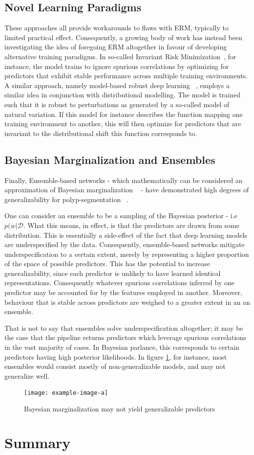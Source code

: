 \subsection{Novel Learning Paradigms}
These approaches all provide workarounds to flaws with ERM, typically to limited practical effect. Consequently, a growing body of work has instead been investigating the idea of foregoing ERM altogether in favour of developing alternative training paradigms. In so-called Invariant Risk Minimization~\cite{IRM}, for instance, the model trains to ignore spurious correlations by optimizing for predictors that exhibit stable performance across multiple training environments. A similar approach, namely model-based robust deep learning ~\cite{modelbased}, employs a similar idea in conjunction with distributional modelling. The model is trained such that it is robust to perturbations as generated by a so-called model of natural variation. If this model for instance describes the function mapping one training environment to another, this will then optimize for predictors that are invariant to the distributional shift this function corresponds to. 

\subsection{Bayesian Marginalization and Ensembles}
Finally, Ensemble-based networks - which mathematically can be considered an approximation of Bayesian marginalization ~\cite{bayesian_case,bayesian_generalization} - have demonstrated high degrees of generalizability for polyp-segmentation ~\cite{divergentnets,endoensemble}. 

One can consider an ensemble to be a sampling of the Bayesian posterior - i.e \(p(w | \mathcal{D}\). What this means, in effect, is that the predictors are drawn from some distribution. This is essentially a side-effect of the fact that deep learning models are underspecified by the data. Consequently, ensemble-based networks mitigate underspecification to a certain extent, merely by representing a higher proportion of the space of possible predictors. This has the potential to increase generalizability, since each predictor is unlikely to have learned identical representations. Consequently whatever spurious correlations inferred by one predictor may be accounted for by the features employed in another. Moreover, behaviour that is stable across predictors are weighed to a greater extent in an an ensemble. 

That is not to say that ensembles solve underspecification altogether; it may be the case that the pipeline returns predictors which leverage spurious correlations in the vast majority of cases. In Bayesian parlance, this corresponds to certain predictors having high posterior likelihoods. In figure \ref{fig:bayesian_generalization}, for instance, most ensembles would consist mostly of non-generalizable models, and may not generalize well. 
\begin{figure}
    \centering
    \texttt{[image: example-image-a]}
    \caption{Bayesian marginalization may not yield generalizable predictors}
    \label{fig:bayesian_generalization}
\end{figure}
\section{Summary}
